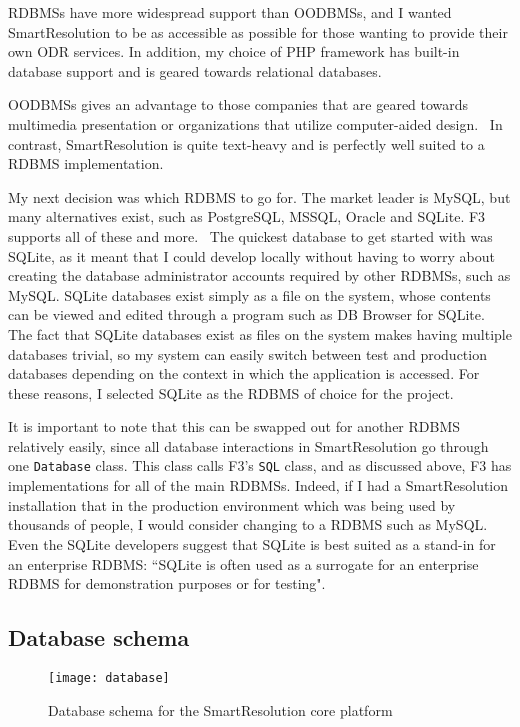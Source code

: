 RDBMSs have more widespread support than OODBMSs, and I wanted SmartResolution to be as accessible as possible for those wanting to provide their own ODR services. In addition, my choice of PHP framework has built-in database support and is geared towards relational databases.

OODBMSs gives an advantage to those companies that are geared towards multimedia presentation or organizations that utilize computer-aided design.~\cite{oodbms} In contrast, SmartResolution is quite text-heavy and is perfectly well suited to a RDBMS implementation.

My next decision was which RDBMS to go for. The market leader is MySQL, but many alternatives exist, such as PostgreSQL, MSSQL, Oracle and SQLite. F3 supports all of these and more.~\cite{f3:sqlConstructor} The quickest database to get started with was SQLite, as it meant that I could develop locally without having to worry about creating the database administrator accounts required by other RDBMSs, such as MySQL. SQLite databases exist simply as a file on the system, whose contents can be viewed and edited through a program such as DB Browser for SQLite. The fact that SQLite databases exist as files on the system makes having multiple databases trivial, so my system can easily switch between test and production databases depending on the context in which the application is accessed. For these reasons, I selected SQLite as the RDBMS of choice for the project.

It is important to note that this can be swapped out for another RDBMS relatively easily, since all database interactions in SmartResolution go through one \lstinline{Database} class. This class calls F3's \lstinline{SQL} class, and as discussed above, F3 has implementations for all of the main RDBMSs. Indeed, if I had a SmartResolution installation that in the production environment which was being used by thousands of people, I would consider changing to a RDBMS such as MySQL. Even the SQLite developers suggest that SQLite is best suited as a stand-in for an enterprise RDBMS: ``SQLite is often used as a surrogate for an enterprise RDBMS for demonstration purposes or for testing".~\cite{sqliteFeatures}

\subsection{Database schema}

\begin{figure}[h!]
  \centering
    \ifimages
    \texttt{[image: database]}
    \fi
  \caption{Database schema for the SmartResolution core platform}
  \label{uml:databaseSchema}
\end{figure}

